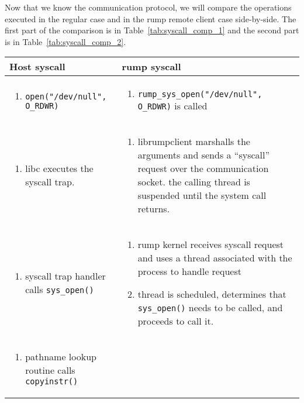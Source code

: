Now that we know the communication protocol, we will compare the
operations executed in the regular case and in the rump remote
client case side-by-side.  The first part of the comparison
is in Table~\ref{tab:syscall_comp_1} and the second part is
in Table~\ref{tab:syscall_comp_2}.

\begin{table}
{\small
\begin{tabular}{| p{7cm} | p{7cm} |}
\hline
Host syscall & rump syscall \\
\hline
\hline

\begin{enumerate}
\item	\verb+open("/dev/null", O_RDWR)+
\end{enumerate}
&

\begin{enumerate}
\item \verb+rump_sys_open("/dev/null",+ \verb+O_RDWR)+ is called
\end{enumerate}
\\
\hline

\begin{enumerate}[start=2]
\item   libc executes the syscall trap.
\end{enumerate}
&

\begin{enumerate}[start=2]
\item	librumpclient marshalls the arguments and sends a ``syscall'' request
	over the communication socket.  the calling thread is suspended
	until the system call returns.
\end{enumerate}
\\
\hline

\begin{enumerate}[start=3]
\item   syscall trap handler calls \verb+sys_open()+
\end{enumerate}
&

\begin{enumerate}[start=3]
\item   rump kernel receives syscall request and uses
	a thread associated with the process to handle request
\item	thread is scheduled, determines that \verb+sys_open()+ needs to
	be called, and proceeds to call it.
\end{enumerate}
\\
\hline

\begin{enumerate}[start=4]
\item   pathname lookup routine calls \verb+copyinstr()+
\end{enumerate}
&


\end{tabular}}
\end{table}
